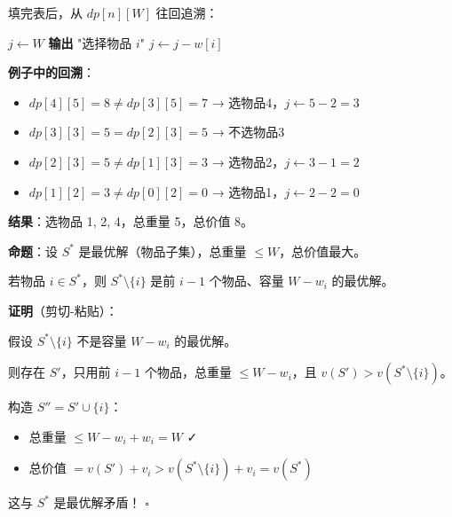 \documentclass[12pt, a4paper]{ctexart}
\begin{document}
\begin{blackboard}[回溯：找出选了哪些物品]

填完表后，从 $dp[n][W]$ 往回追溯：

\begin{algorithmic}[1]
\STATE $j \gets W$
        \STATE \textbf{输出} "选择物品 $i$"
        \STATE $j \gets j - w[i]$
    \ENDIF
\ENDFOR
\end{algorithmic}

\textbf{例子中的回溯}：
\begin{itemize}
    \item $dp[4][5] = 8 \neq dp[3][5] = 7$ → 选物品4，$j \gets 5 - 2 = 3$
    \item $dp[3][3] = 5 = dp[2][3] = 5$ → 不选物品3
    \item $dp[2][3] = 5 \neq dp[1][3] = 3$ → 选物品2，$j \gets 3 - 1 = 2$
    \item $dp[1][2] = 3 \neq dp[0][2] = 0$ → 选物品1，$j \gets 2 - 2 = 0$
\end{itemize}

\textbf{结果}：选物品 1, 2, 4，总重量 5，总价值 8。

\end{blackboard}

\begin{blackboard}[0-1 背包的最优子结构证明]

\textbf{命题}：设 $S^*$ 是最优解（物品子集），总重量 $\leq W$，总价值最大。

若物品 $i \in S^*$，则 $S^* \setminus \{i\}$ 是前 $i-1$ 个物品、容量 $W - w_i$ 的最优解。

\textbf{证明}（剪切-粘贴）：

假设 $S^* \setminus \{i\}$ 不是容量 $W - w_i$ 的最优解。

则存在 $S'$，只用前 $i-1$ 个物品，总重量 $\leq W - w_i$，且 $v(S') > v(S^* \setminus \{i\})$。

构造 $S'' = S' \cup \{i\}$：
\begin{itemize}
    \item 总重量 $\leq W - w_i + w_i = W$ ✓
    \item 总价值 $= v(S') + v_i > v(S^* \setminus \{i\}) + v_i = v(S^*)$
\end{itemize}

这与 $S^*$ 是最优解矛盾！ $\square$

\end{blackboard}
\end{document}
